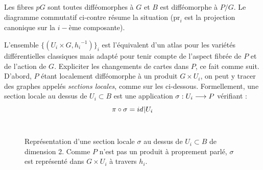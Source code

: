 \begin{definition}
\begin{adjustbox}{valign=C,raise=1cm, minipage={1.1\linewidth}}
		Les fibres $pG$ sont toutes difféomorphes à $G$ et $B$ est difféomorphe à $P/G$. Le diagramme commutatif ci-contre résume la situation ($\text{pr}_i$ est la projection canonique sur la $i-$ème composante).
	\end{adjustbox}
\end{definition}
\skipl 


L'ensemble $\big\{(U_i\times G, {h_i}^{-1})\big\}_i$ est l'équivalent d'un atlas pour les variétés différentielles classiques mais adapté pour tenir compte de l'aspect fibrée de $P$ et de l'action de $G$. Expliciter les changements de cartes dans $P$, ce fait comme suit.
\\
D'abord, $P$ étant localement difféomorphe à un produit $G\times U_i$, on peut y tracer des graphes appelés \emph{sections locales}, comme sur les  ci-dessous. Formellement, une section locale au dessus  de $U_i \subset B$ est une application $\sigma : U_i \longrightarrow P$ vérifiant :
\[\pi\circ \sigma = id_{}{{\displaystyle |}U_i}\]
\\

\begin{figure}[h]
	
	\caption[\DONE Représentation d'une section local]
		{Représentation d'une section locale $\sigma$ au dessus de $U_i\subset B$ de dimension 2. 
		Comme $P$ n'est pas un produit à proprement parlé, $\sigma$ est représenté dans $G\times U_i$ à travers $h_i$.}
	\label{fig:section_local}
\end{figure}
\skipl

